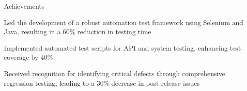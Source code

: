 \documentclass{resume} %
\begin{document}
    \begin{rSection}{Achievements}
        \begin{rSubsection}{}{}{}
                            \item Led the development of a robust automation test framework using Selenium and Java, resulting in a 60\% reduction in testing time
                            \item Implemented automated test scripts for API and system testing, enhancing test coverage by 40\%
                            \item Received recognition for identifying critical defects through comprehensive regression testing, leading to a 30\% decrease in post{-}release issues
                    \end{rSubsection}
    \end{rSection}
\end{document}
